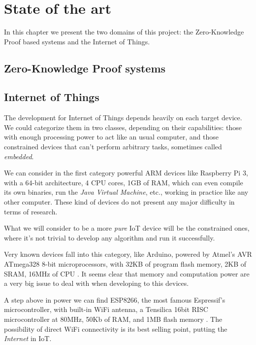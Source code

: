 \chapter{State of the art}\label{ch:stateoftheart}

In this chapter we present the two domains of this project: the Zero-Knowledge Proof based systems and the Internet of Things.


\section{Zero-Knowledge Proof systems}



\section{Internet of Things}

The development for Internet of Things depends heavily on each target device. We could categorize them in two classes, depending on their capabilities: those with enough processing power to act like an usual computer, and those constrained devices that can't perform arbitrary tasks, sometimes called \textit{embedded}.


We can consider in the first category powerful ARM devices like Raspberry Pi 3, with a 64-bit architecture, 4 CPU cores, 1GB of RAM, which can even compile its own binaries, run the \textit{Java Virtual Machine}, etc., working in practice like any other computer. These kind of devices do not present any major difficulty in terms of research.

What we will consider to be a more \textit{pure} \ac{IoT} device will be the constrained ones, where it's not trivial to develop any algorithm and run it successfully.

Very known devices fall into this category, like Arduino, powered by Atmel's AVR ATmega328 8-bit microprocessors, with 32KB of program flash memory, 2KB of SRAM, 16MHz of CPU \citep{ATmega328}. It seems clear that memory and computation power are a very big issue to deal with when developing to this devices.

A step above in power we can find ESP8266, the most famous Espressif's microcontroller, with built-in WiFi antenna, a Tensilica 16bit RISC microcontroller at 80MHz, 50Kb of RAM, and 1MB flash memory \citep{ESP8266}. The possibility of direct WiFi connectivity is its best selling point, putting the \textit{Internet} in \acl{IoT}.

